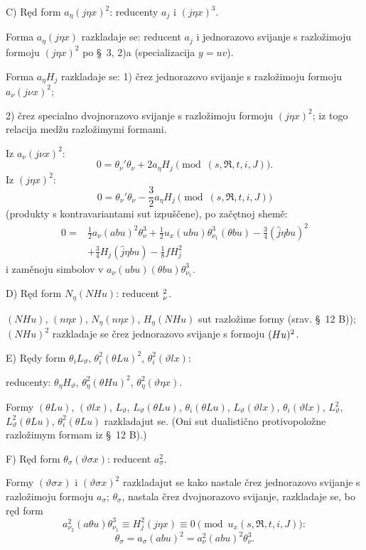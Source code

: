 \documentclass[11pt]{article}
\let\A\relax
\newcommand{\A}{\mathfrak A}
\newcommand{\R}{\mathfrak R}
\begin{document}
\noindent\mbox{C)} Ręd form $a_\eta(j\eta x)^2$: reducenty $a_j$ i $(j\eta x)^3$.

Forma $a_\eta(j\eta x)$ razkladaje se: reducent $a_j$ i jednorazovo svijanje s razložimoju formoju $(j\eta x)^2$ po \S\ 3, 2)\mbox{a} (specializacija $y=uv$).

Forma $a_\eta H_j$ razkladaje se: 1) črez jednorazovo svijanje s razložimoju formoju $a_\nu(j\nu x)^2$;

2) črez specialno dvojnorazovo svijanje s razložimoju formoju $(j\eta x)^2$; iz togo relacija medžu razložimymi formami.

Iz $a_\nu(j\nu x)^2$:
\[
0=\theta_\nu'\theta_\nu+2a_\eta H_j\pmod{(s,\R,t,i,J)}.
\]
Iz $(j\eta x)^2$:
\[
0=\theta_\nu'\theta_\nu-\frac32a_\eta H_j\pmod{(s,\R,t,i,J)}
\]
(produkty s kontravariantami sut izpuščene), po začętnoj shemě:
\[
\begin{aligned}
0={}&\frac12a_\nu(abu)^2\theta_\nu^3
+\frac12u_x(ubu)\theta_{\nu_1}^3(\theta bu)
-\frac34(\widehat{j}\eta bu)^2\\
&+\frac34H_j(\widehat{j}\eta bu)-\frac18fH_j^2
\end{aligned}
\]
i zaměnoju simbolov v $a_\nu(ubu)(\theta bu)\theta_{\nu_1}^3$.

\noindent\mbox{D)} Ręd form $N_\eta(NHu)$: reducent $\A_\nu^2$.

$(NHu)$, $(n\eta x)$, $N_\eta(n\eta x)$, $H_\eta(NHu)$ sut razložime formy (srav. \S\ 12 \mbox{B)}); $(NHu)^2$ razkladaje se črez jednorazovo svijanje s formoju $(\A Hu)^2$.

\noindent\mbox{E)} Rędy form $\theta_iL_\vartheta$, $\theta_i^2(\theta Lu)^2$, $\theta_i^2(\vartheta lx)$:

reducenty: $\theta_\eta H_\vartheta$, $\theta_\eta^2(\theta Hu)^2$, $\theta_\eta^2(\vartheta\eta x)$.

Formy $(\theta Lu)$, $(\vartheta lx)$, $L_\vartheta$, $L_\vartheta(\theta Lu)$, $\theta_i(\theta Lu)$, $L_\vartheta(\vartheta lx)$, $\theta_i(\vartheta lx)$, $L_\vartheta^2$, $L_\vartheta^2(\theta Lu)$, $\theta_i^2(\theta Lu)$ razkladajut se. (Oni sut dualistično protivopoložne razložimym formam iz \S\ 12 \mbox{B)}.)

\noindent\mbox{F)} Ręd form $\theta_\sigma(\vartheta\sigma x)$: reducent $a_\sigma^2$.

Formy $(\vartheta\sigma x)$ i $(\vartheta\sigma x)^2$ razkladajut se kako nastale črez jednorazovo svijanje s razložimoju formoju $a_\sigma$; $\theta_\sigma$, nastala črez dvojnorazovo svijanje, razkladaje se, bo ręd form
\[
a_{\nu_2}^2(a\theta u)\theta_{\nu_1}^3\equiv H_j^2(j\eta x)\equiv0\pmod{u_x(s,\R,t,i,J)}:
\]
\[
\theta_\sigma=a_\sigma(abu)^2=a_\nu^2(abu)^2\theta_\nu^3.
\]
\end{document}
